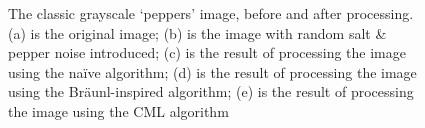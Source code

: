 \begin{figure}
\caption{\label{fig:median:peppers}The classic grayscale `peppers' image, before and after processing.  (a) is the original image; (b) is the image with random salt \& pepper noise introduced; (c) is the result of processing the image using the na\"{i}ve algorithm; (d) is the result of processing the image using the Br\"{a}unl-inspired algorithm; (e) is the result of processing the image using the CML algorithm}
\end{figure}

